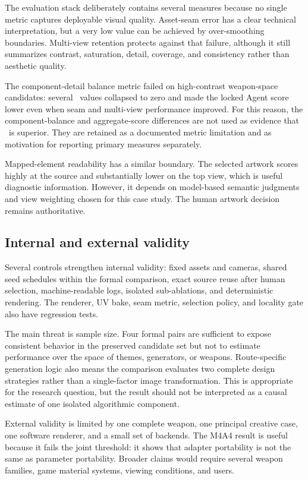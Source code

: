 The evaluation stack deliberately contains several measures because no single
metric captures deployable visual quality. Asset-seam error has a clear technical
interpretation, but a very low value can be achieved by over-smoothing boundaries.
Multi-view retention protects against that failure, although it still summarizes
contrast, saturation, detail, coverage, and consistency rather than aesthetic
quality.

The component-detail balance metric failed on high-contrast weapon-space
candidates: several \routeB\ values collapsed to zero and made the locked Agent
score lower even when seam and multi-view performance improved. For this reason,
the component-balance and aggregate-score differences are not used as evidence
that \routeA\ is superior. They are retained as a documented metric limitation and
as motivation for reporting primary measures separately.

Mapped-element readability has a similar boundary. The selected artwork scores
highly at the source and substantially lower on the top view, which is useful
diagnostic information. However, it depends on model-based semantic judgments and
view weighting chosen for this case study. The human artwork decision remains
authoritative.

\subsection{Internal and external validity}

Several controls strengthen internal validity: fixed assets and cameras, shared
seed schedules within the formal comparison, exact source reuse after human
selection, machine-readable logs, isolated sub-ablations, and deterministic
rendering. The renderer, UV bake, seam metric, selection policy, and locality gate
also have regression tests.

The main threat is sample size. Four formal pairs are sufficient to expose
consistent behavior in the preserved candidate set but not to estimate performance
over the space of themes, generators, or weapons. Route-specific generation logic
also means the comparison evaluates two complete design strategies rather than a
single-factor image transformation. This is appropriate for the research question,
but the result should not be interpreted as a causal estimate of one isolated
algorithmic component.

External validity is limited by one complete weapon, one principal creative case,
one software renderer, and a small set of backends. The M4A4 result is useful
because it fails the joint threshold: it shows that adapter portability is not the
same as parameter portability. Broader claims would require several weapon
families, game material systems, viewing conditions, and users.

